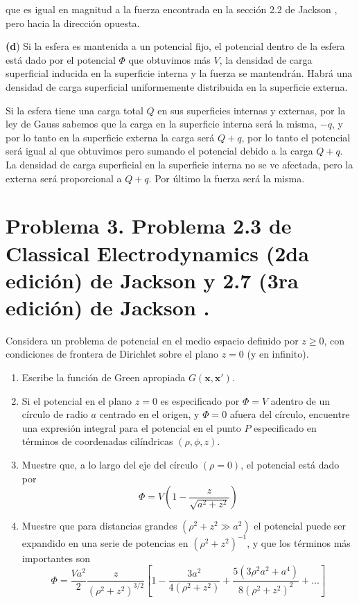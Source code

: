 \documentclass[a4paper,11pt]{article}
\numberwithin{equation}{section}
\begin{document}
que es igual en magnitud a la fuerza encontrada en la sección 2.2 de Jackson \cite{jackson3},
pero hacia la dirección opuesta.

\vspace{.3cm}

\textbf{(d}) Si la esfera es mantenida a un potencial fijo, el potencial dentro de 
la esfera está dado por el potencial $\Phi$ que obtuvimos más $V$, la densidad de 
carga superficial inducida en la superficie interna y la fuerza se mantendrán. Habrá 
una densidad de carga superficial uniformemente distribuida en la superficie 
externa.

\vspace{.3cm}

Si la esfera tiene una carga total $Q$ en sus superficies internas y externas, 
por la ley de Gauss sabemos que la carga en la superficie interna será la misma, 
$-q$, y por lo tanto en la superficie externa la carga será $Q+q$, por lo tanto 
el potencial será igual al que obtuvimos pero sumando el potencial debido a la 
carga $Q+q$. La densidad de carga superficial en la superficie interna no se ve 
afectada, pero la externa será proporcional a $Q+q$. Por último la fuerza será 
la misma.

\newpage

\section{Problema 3. Problema 2.3 de Classical Electrodynamics (2da edición) de Jackson 
\cite{jackson2} y 2.7 (3ra edición) de Jackson \cite{jackson3}.}

Considera un problema de potencial en el medio espacio definido por $z \geq 0$, con 
condiciones de frontera de Dirichlet sobre el plano $z = 0$ (y en infinito).

\begin{enumerate}[label=\textbf{(\alph*)}]
 \item Escribe la función de Green apropiada $G(\mathbf{x},\mathbf{x}')$.
 \item Si el potencial en el plano $z = 0$ es especificado por $\Phi = V$ adentro de un círculo 
 de radio $a$ centrado en el origen, y $\Phi = 0$ afuera del círculo, encuentre 
 una expresión integral para el potencial en el punto $P$ especificado en términos 
 de coordenadas cilíndricas $(\rho,\phi,z)$.
 \item Muestre que, a lo largo del eje del círculo $(\rho = 0)$, el potencial está 
 dado por 
 $$
 \Phi = V\left(1 - \frac{z}{\sqrt{a^2+z^2}}\right)
 $$
 \item Muestre que para distancias grandes $(\rho^2 + z^2 \gg a^2)$ el potencial 
 puede ser expandido en una serie de potencias en $(\rho^2 + z^2)^{-1}$, y que 
 los términos más importantes son 
 $$
 \Phi = \frac{Va^2}{2}\frac{z}{(\rho^2 + z^2)^{3/2}}\left[1 - 
 \frac{3a^2}{4(\rho^2 + z^2)} + \frac{5(3\rho^2a^2+a^4)}{8(\rho^2 + z^2)^2} 
 + \dots \right]
 $$
\end{enumerate}
\end{document}
